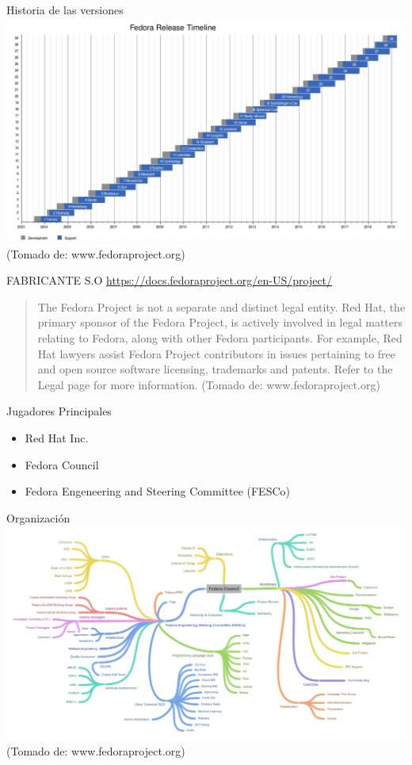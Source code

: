 \documentclass[presentation]{beamer}
\begin{document}
\begin{frame}[label=sec-6]{Historia de las versiones}
\includegraphics[width=.9\linewidth]{./timeline.png}
(Tomado de: www.fedoraproject.org)
\end{frame}

\begin{frame}[label=sec-7]{FABRICANTE S.O}
\url{https://docs.fedoraproject.org/en-US/project/}
\begin{quote}
The Fedora Project is not a separate and distinct legal entity.
 Red Hat, the primary sponsor of the Fedora Project, is actively involved in legal matters relating to Fedora, along with other Fedora participants.
 For example, Red Hat lawyers assist Fedora Project contributors in issues pertaining to free and open source software licensing, trademarks and patents.
 Refer to the Legal page for more information. (Tomado de: www.fedoraproject.org)
\end{quote}

\begin{block}{Jugadores Principales}
\begin{itemize}
\item Red Hat Inc.
\item Fedora Council
\item Fedora Engeneering and Steering Committee (FESCo)
\end{itemize}
\end{block}
\end{frame}
\begin{frame}[label=sec-8]{Organización}
\includegraphics[width=.9\linewidth]{./orgchart.png}
(Tomado de: www.fedoraproject.org)
\end{frame}
\end{document}
